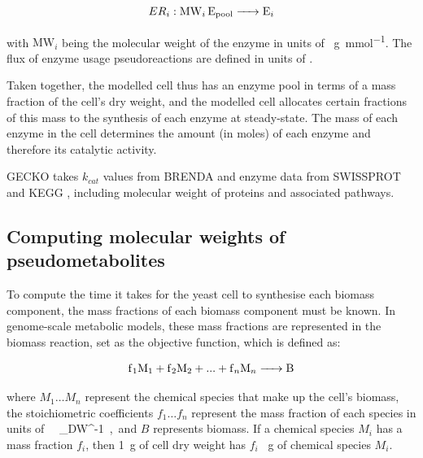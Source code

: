 \begin{equation}
  ER_{i}: \ce{ MW_{i} E_{\mathrm{pool}} -> E_{i} }
  \label{eq:model-gecko-enzyme-usage}
\end{equation}

with $\mathrm{MW}_{i}$ being the molecular weight of the enzyme in units of \SI{}{\gram~\milli\mole^{-1}}.
The flux of enzyme usage pseudoreactions are defined in units of \SI{}{\mmolgdw}.

Taken together, the modelled cell thus has an enzyme pool in terms of a mass fraction of the cell's dry weight, and the modelled cell allocates certain fractions of this mass to the synthesis of each enzyme at steady-state.  The mass of each enzyme in the cell determines the amount (in moles) of each enzyme and therefore its catalytic activity.

GECKO takes $k_{cat}$ values from BRENDA \parencite{changBRENDAELIXIRCore2021} and enzyme data from SWISSPROT \parencite{theuniprotconsortiumUniProtUniversalProtein2023} and KEGG \parencite{kanehisaKEGGTaxonomybasedAnalysis2023}, including molecular weight of proteins and associated pathways.

\subsection{Computing molecular weights of pseudometabolites}
\label{subsec:model-yeast8-molweights}

To compute the time it takes for the yeast cell to synthesise each biomass component, the mass fractions of each biomass component must be known.
In genome-scale metabolic models, these mass fractions are represented in the biomass reaction, set as the objective function, which is defined as:

\begin{equation}
  \ce{f_{1}M1 + f_{2}M2 + ... + f_{n}M_{n} -> B}
  \label{eq:model-biomass-reaction}
\end{equation}

where $M_{1} \ldots M_{n}$ represent the chemical species that make up the cell's biomass, the stoichiometric coefficients $f_{1} \ldots f_{n}$ represent the mass fraction of each species in units of \SI{}{\gram~\gram_{DW}^{-1}}, and $B$ represents biomass.
If a chemical species $M_{i}$ has a mass fraction $f_{i}$, then \SI{1}{\gram} of cell dry weight has $f_{i}$ \SI{}{\gram} of chemical species $M_{i}$.

